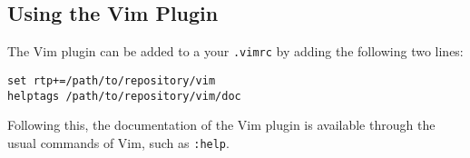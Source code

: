 \subsection{Using the Vim Plugin}
The Vim plugin can be added to a your \lstinline|.vimrc| by adding the following
two lines:

\begin{lstlisting}
set rtp+=/path/to/repository/vim
helptags /path/to/repository/vim/doc
\end{lstlisting}

Following this, the documentation of the Vim plugin is available through the
usual commands of Vim, such as \lstinline|:help|.
